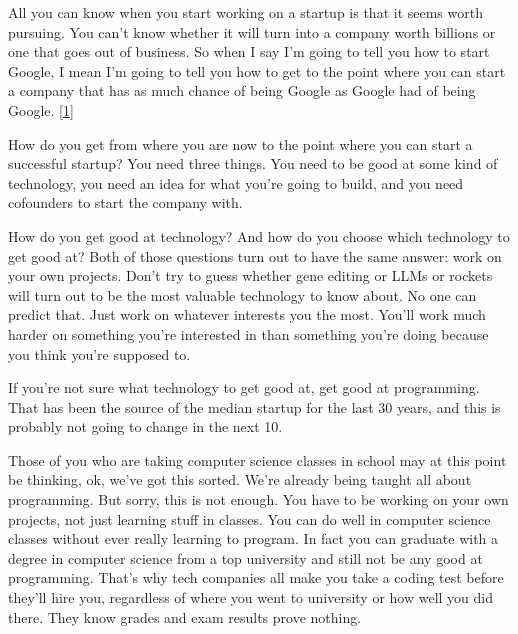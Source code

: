 All
                  you can know when you start working on a startup is that it
                  seems worth pursuing. You can't know whether it will turn into
                  a company worth billions or one that goes out of business. So
                  when I say I'm going to tell you how to start Google, I mean
                  I'm going to tell you how to get to the point where you can
                  start a company that has as much chance of being Google as
                  Google had of being Google.
                  [\href{\#f1n}{1}]

How do you get from where you are now to the
                  point where you can start a successful startup? You need three
                  things. You need to be good at some kind of technology, you
                  need an idea for what you're going to build, and you need
                  cofounders to start the company with.

How do you
                  get good at technology? And how do you choose which technology
                  to get good at? Both of those questions turn out to have the
                  same answer: work on your own projects. Don't try to guess
                  whether gene editing or LLMs or rockets will turn out to be
                  the most valuable technology to know about. No one can predict
                  that. Just work on whatever interests you the most. You'll
                  work much harder on something you're interested in than
                  something you're doing because you think you're supposed
                  to.

If you're not sure what technology to get good
                  at, get good at programming. That has been the source of the
                  median startup for the last 30 years, and this is probably not
                  going to change in the next 10.

Those of you who
                  are taking computer science classes in school may at this
                  point be thinking, ok, we've got this sorted. We're already
                  being taught all about programming. But sorry, this is not
                  enough. You have to be working on your own projects, not just
                  learning stuff in classes. You can do well in computer science
                  classes without ever really learning to program. In fact you
                  can graduate with a degree in computer science from a top
                  university and still not be any good at programming. That's
                  why tech companies all make you take a coding test before
                  they'll hire you, regardless of where you went to university
                  or how well you did there. They know grades and exam results
                  prove nothing.

